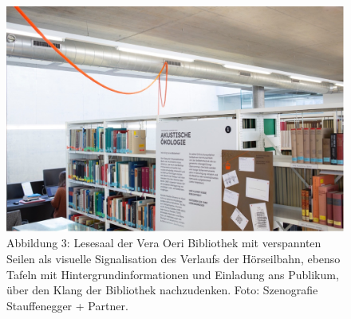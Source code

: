 \documentclass[a4paper,
fontsize=11pt,
oneside,
numbers=noperiodatend,
parskip=half-,
bibliography=totoc,
final
]{scrartcl}
\begin{document}
\begin{figure}[h]
\centering
\includegraphics{img/Abb3.jpg}
\caption{Abbildung 3: Lesesaal der Vera Oeri Bibliothek mit verspannten
Seilen als visuelle Signalisation des Verlaufs der Hörseilbahn, ebenso
Tafeln mit Hintergrundinformationen und Einladung ans Publikum, über den
Klang der Bibliothek nachzudenken. Foto: Szenografie Stauffenegger +
Partner.}
\end{figure}
\end{document}
